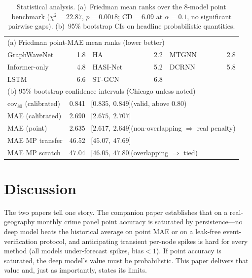 \documentclass[11pt,conference]{IEEEtran}
\begin{document}
\begin{table}[t]
\centering
\caption{Statistical analysis. (a)~Friedman mean ranks over the 8-model point
benchmark ($\chi^2{=}22.87$, $p{=}0.0018$; CD${=}6.09$ at $\alpha{=}0.1$, no
significant pairwise gaps). (b)~95\% bootstrap CIs on headline probabilistic
quantities.}
\label{tab:stats}
\small
\begin{tabular}{lr@{\hskip 6pt}lr@{\hskip 6pt}lr}
\toprule
\multicolumn{6}{l}{(a) Friedman point-MAE mean ranks (lower better)}\\
GraphWaveNet & 1.8 & HA & 2.2 & MTGNN & 2.8\\
Informer-only & 4.8 & HASI-Net & 5.2 & DCRNN & 5.8\\
LSTM & 6.6 & ST-GCN & 6.8 & & \\
\midrule
\multicolumn{6}{l}{(b) 95\% bootstrap confidence intervals (Chicago unless noted)}\\
cov$_{80}$ (calibrated)    & \multicolumn{5}{l}{0.841 \ [$0.835,\ 0.849$]\quad(valid, above 0.80)}\\
MAE (calibrated)           & \multicolumn{5}{l}{2.690 \ [$2.675,\ 2.707$]}\\
MAE (point)                & \multicolumn{5}{l}{2.635 \ [$2.617,\ 2.649$]\quad(non-overlapping $\Rightarrow$ real penalty)}\\
MAE MP transfer            & \multicolumn{5}{l}{46.52 \ [$45.07,\ 47.69$]}\\
MAE MP scratch            & \multicolumn{5}{l}{47.04 \ [$46.05,\ 47.80$]\quad(overlapping $\Rightarrow$ tied)}\\
\bottomrule
\end{tabular}
\end{table}

\section{Discussion}\label{sec:disc}
The two papers tell one story. The companion paper establishes that on a
real-geography monthly crime panel point accuracy is saturated by
persistence---no deep model beats the historical average on point MAE or on a
leak-free event-verification protocol, and anticipating transient per-node spikes
is hard for every method (all models under-forecast spikes, bias${<}1$). If point
accuracy is saturated, the deep model's value must be probabilistic. This paper
delivers that value and, just as importantly, states its limits.
\end{document}

